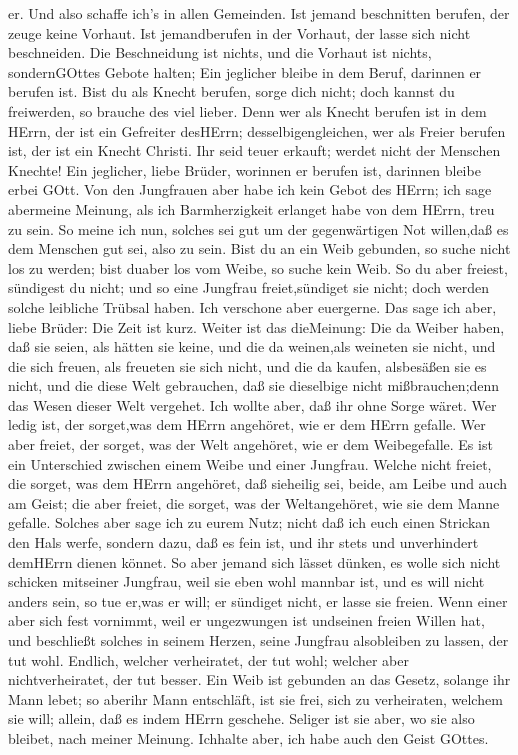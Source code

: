er. Und also schaffe ich's in allen Gemeinden.  Ist jemand
beschnitten berufen, der zeuge keine Vorhaut. Ist jemandberufen in der
Vorhaut, der lasse sich nicht beschneiden.  Die
Beschneidung ist nichts, und die Vorhaut ist nichts, sondernGOttes
Gebote halten;  Ein jeglicher bleibe in dem Beruf, darinnen
er berufen ist.  Bist du als Knecht berufen, sorge dich
nicht; doch kannst du freiwerden, so brauche des viel lieber.
 Denn wer als Knecht berufen ist in dem HErrn, der ist ein
Gefreiter desHErrn; desselbigengleichen, wer als Freier berufen ist, der
ist ein Knecht Christi.  Ihr seid teuer erkauft; werdet
nicht der Menschen Knechte!  Ein jeglicher, liebe Brüder,
worinnen er berufen ist, darinnen bleibe erbei GOtt.  Von
den Jungfrauen aber habe ich kein Gebot des HErrn; ich sage abermeine
Meinung, als ich Barmherzigkeit erlanget habe von dem HErrn, treu zu
sein.  So meine ich nun, solches sei gut um der
gegenwärtigen Not willen,daß es dem Menschen gut sei, also zu sein.
 Bist du an ein Weib gebunden, so suche nicht los zu
werden; bist duaber los vom Weibe, so suche kein Weib.  So
du aber freiest, sündigest du nicht; und so eine Jungfrau
freiet,sündiget sie nicht; doch werden solche leibliche Trübsal haben.
Ich verschone aber euergerne.  Das sage ich aber, liebe
Brüder: Die Zeit ist kurz. Weiter ist das dieMeinung: Die da Weiber
haben, daß sie seien, als hätten sie keine, und die da weinen,als
weineten sie nicht,  und die sich freuen, als freueten sie
sich nicht, und die da kaufen, alsbesäßen sie es nicht, 
und die diese Welt gebrauchen, daß sie dieselbige nicht mißbrauchen;denn
das Wesen dieser Welt vergehet.  Ich wollte aber, daß ihr
ohne Sorge wäret. Wer ledig ist, der sorget,was dem HErrn angehöret, wie
er dem HErrn gefalle.  Wer aber freiet, der sorget, was der
Welt angehöret, wie er dem Weibegefalle. Es ist ein Unterschied zwischen
einem Weibe und einer Jungfrau.  Welche nicht freiet, die
sorget, was dem HErrn angehöret, daß sieheilig sei, beide, am Leibe und
auch am Geist; die aber freiet, die sorget, was der Weltangehöret, wie
sie dem Manne gefalle.  Solches aber sage ich zu eurem
Nutz; nicht daß ich euch einen Strickan den Hals werfe, sondern dazu,
daß es fein ist, und ihr stets und unverhindert demHErrn dienen könnet.
 So aber jemand sich lässet dünken, es wolle sich nicht
schicken mitseiner Jungfrau, weil sie eben wohl mannbar ist, und es will
nicht anders sein, so tue er,was er will; er sündiget nicht, er lasse
sie freien.  Wenn einer aber sich fest vornimmt, weil er
ungezwungen ist undseinen freien Willen hat, und beschließt solches in
seinem Herzen, seine Jungfrau alsobleiben zu lassen, der tut wohl.
 Endlich, welcher verheiratet, der tut wohl; welcher aber
nichtverheiratet, der tut besser.  Ein Weib ist gebunden an
das Gesetz, solange ihr Mann lebet; so aberihr Mann entschläft, ist sie
frei, sich zu verheiraten, welchem sie will; allein, daß es indem HErrn
geschehe.  Seliger ist sie aber, wo sie also bleibet, nach
meiner Meinung. Ichhalte aber, ich habe auch den Geist GOttes.

